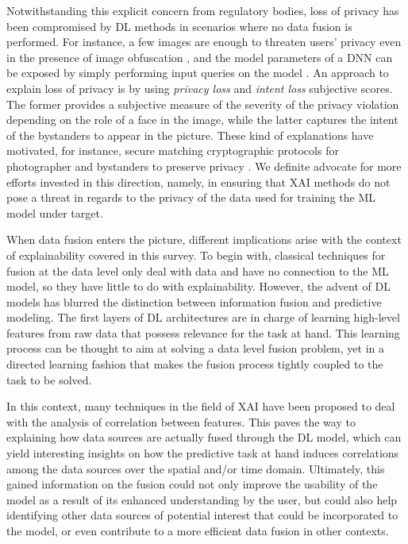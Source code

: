 \documentclass[final]{elsarticle}
\begin{document}
Notwithstanding this explicit concern from regulatory bodies, loss of privacy has been compromised by DL methods in scenarios where no data fusion is performed. For instance, a few images are enough to threaten users' privacy even in the presence of image obfuscation \cite{Oh16}, and the model parameters of a DNN can be exposed by simply performing input queries on the model \cite{Orekondy18,Oh19}. An approach to explain loss of privacy is by using \textit{privacy loss} and \textit{intent loss} subjective scores. The former provides a subjective measure of the severity of the privacy violation depending on the role of a face in the image, while the latter captures the intent of the bystanders to appear in the picture. These kind of explanations have motivated, for instance, secure matching cryptographic protocols for photographer and bystanders to preserve privacy \cite{Orekondy18, Aditya16, sun2018hybrid}. We definite advocate for more efforts invested in this direction, namely, in ensuring that XAI methods do not pose a threat in regards to the privacy of the data used for training the ML model under target.

When data fusion enters the picture, different implications arise with the context of explainability covered in this survey. To begin with, classical techniques for fusion at the data level only deal with data and have no connection to the ML model, so they have little to do with explainability. However, the advent of DL models has blurred the distinction between information fusion and predictive modeling. The first layers of DL architectures are in charge of learning high-level features from raw data that possess relevance for the task at hand. This learning process can be thought to aim at solving a data level fusion problem, yet in a directed learning fashion that makes the fusion process tightly coupled to the task to be solved. 

In this context, many techniques in the field of XAI have been proposed to deal with the analysis of correlation between features. This paves the way to explaining how data sources are actually fused through the DL model, which can yield interesting insights on how the predictive task at hand induces correlations among the data sources over the spatial and/or time domain. Ultimately, this gained information on the fusion could not only improve the usability of the model as a result of its enhanced understanding by the user, but could also help identifying other data sources of potential interest that could be incorporated to the model, or even contribute to a more efficient data fusion in other contexts. 
\end{document}
